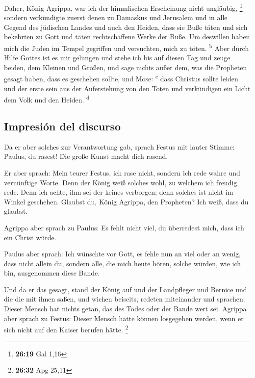  Daher, König Agrippa, war ich der himmlischen
Erscheinung nicht ungläubig, \footnote{\textbf{26:19} Gal 1,16}
 sondern verkündigte zuerst denen zu Damaskus und
Jerusalem und in alle Gegend des jüdischen Landes und auch den Heiden,
dass sie Buße täten und sich bekehrten zu Gott und täten rechtschaffene
Werke der Buße.  Um deswillen haben mich die Juden im
Tempel gegriffen und versuchten, mich zu töten. \textsuperscript{b}
 Aber durch Hilfe Gottes ist es mir gelungen und stehe
ich bis auf diesen Tag und zeuge beiden, dem Kleinen und Großen, und
sage nichts außer dem, was die Propheten gesagt haben, dass es geschehen
sollte, und Mose: \textsuperscript{c}  dass Christus
sollte leiden und der erste sein aus der Auferstehung von den Toten und
verkündigen ein Licht dem Volk und den Heiden. \textsuperscript{d}

\hypertarget{impresiuxf3n-del-discurso}{%
\subsection{Impresión del discurso}\label{impresiuxf3n-del-discurso}}

 Da er aber solches zur Verantwortung gab, sprach Festus
mit lauter Stimme: Paulus, du rasest! Die große Kunst macht dich rasend.

 Er aber sprach: Mein teurer Festus, ich rase nicht,
sondern ich rede wahre und vernünftige Worte.  Denn der
König weiß solches wohl, zu welchem ich freudig rede. Denn ich achte,
ihm sei der keines verborgen; denn solches ist nicht im Winkel
geschehen.  Glaubst du, König Agrippa, den Propheten? Ich
weiß, dass du glaubst.

 Agrippa aber sprach zu Paulus: Es fehlt nicht viel, du
überredest mich, dass ich ein Christ würde.

 Paulus aber sprach: Ich wünschte vor Gott, es fehle nun
an viel oder an wenig, dass nicht allein du, sondern alle, die mich
heute hören, solche würden, wie ich bin, ausgenommen diese Bande.

 Und da er das gesagt, stand der König auf und der
Landpfleger und Bernice und die die mit ihnen saßen,  und
wichen beiseits, redeten miteinander und sprachen: Dieser Mensch hat
nichts getan, das des Todes oder der Bande wert sei. 
Agrippa aber sprach zu Festus: Dieser Mensch hätte können losgegeben
werden, wenn er sich nicht auf den Kaiser berufen hätte. \footnote{\textbf{26:32}
  Apg 25,11}

